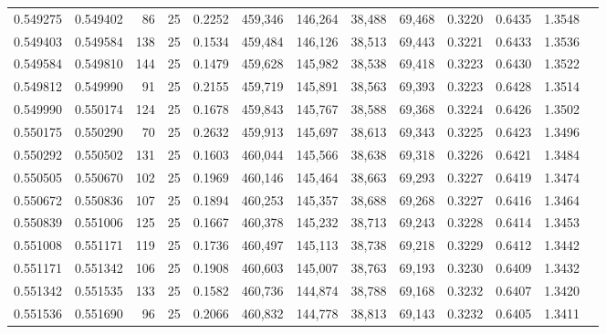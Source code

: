 \begin{tabular}{rrrrrrrrrrrrr}
0.549275 & 0.549402 &    86 &  25 &                                     0.2252 & 459,346 & 146,264 &  38,488 &  69,468 & 0.3220 & 0.6435 & 1.3548 \\
0.549403 & 0.549584 &   138 &  25 &                                     0.1534 & 459,484 & 146,126 &  38,513 &  69,443 & 0.3221 & 0.6433 & 1.3536 \\
0.549584 & 0.549810 &   144 &  25 &                                     0.1479 & 459,628 & 145,982 &  38,538 &  69,418 & 0.3223 & 0.6430 & 1.3522 \\
0.549812 & 0.549990 &    91 &  25 &                                     0.2155 & 459,719 & 145,891 &  38,563 &  69,393 & 0.3223 & 0.6428 & 1.3514 \\
0.549990 & 0.550174 &   124 &  25 &                                     0.1678 & 459,843 & 145,767 &  38,588 &  69,368 & 0.3224 & 0.6426 & 1.3502 \\
0.550175 & 0.550290 &    70 &  25 &                                     0.2632 & 459,913 & 145,697 &  38,613 &  69,343 & 0.3225 & 0.6423 & 1.3496 \\
0.550292 & 0.550502 &   131 &  25 &                                     0.1603 & 460,044 & 145,566 &  38,638 &  69,318 & 0.3226 & 0.6421 & 1.3484 \\
0.550505 & 0.550670 &   102 &  25 &                                     0.1969 & 460,146 & 145,464 &  38,663 &  69,293 & 0.3227 & 0.6419 & 1.3474 \\
0.550672 & 0.550836 &   107 &  25 &                                     0.1894 & 460,253 & 145,357 &  38,688 &  69,268 & 0.3227 & 0.6416 & 1.3464 \\
0.550839 & 0.551006 &   125 &  25 &                                     0.1667 & 460,378 & 145,232 &  38,713 &  69,243 & 0.3228 & 0.6414 & 1.3453 \\
0.551008 & 0.551171 &   119 &  25 &                                     0.1736 & 460,497 & 145,113 &  38,738 &  69,218 & 0.3229 & 0.6412 & 1.3442 \\
0.551171 & 0.551342 &   106 &  25 &                                     0.1908 & 460,603 & 145,007 &  38,763 &  69,193 & 0.3230 & 0.6409 & 1.3432 \\
0.551342 & 0.551535 &   133 &  25 &                                     0.1582 & 460,736 & 144,874 &  38,788 &  69,168 & 0.3232 & 0.6407 & 1.3420 \\
0.551536 & 0.551690 &    96 &  25 &                                     0.2066 & 460,832 & 144,778 &  38,813 &  69,143 & 0.3232 & 0.6405 & 1.3411 \\

\end{tabular}

